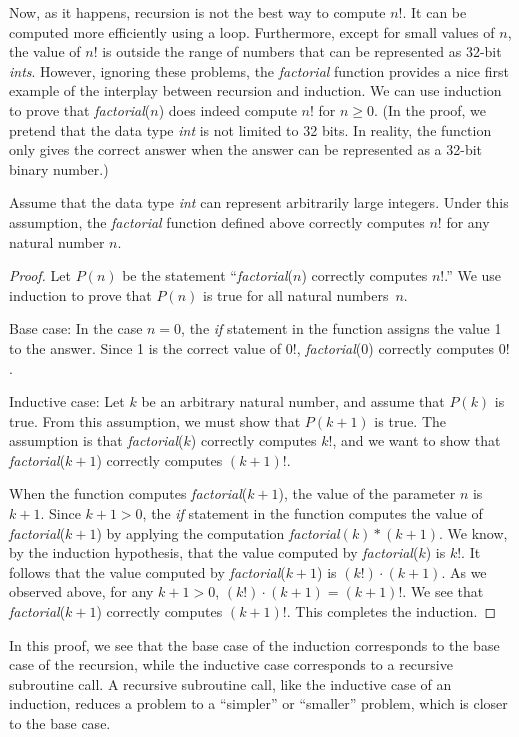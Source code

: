 Now, as it happens, recursion is not the best way to compute $n!$.
It can be computed more efficiently using a loop.  Furthermore,
except for small values of $n$, the value of $n!$ is outside the
range of numbers that can be represented as 32-bit \textit{ints}.
However, ignoring these problems, the \textit{factorial} function
provides a nice first example of the interplay between recursion and
induction.  We can use induction to prove that \textit{factorial}($n$)
does indeed compute $n!$ for $n\ge 0$.  (In the proof, we pretend that
the data type \textit{int} is not limited to 32 bits.  In reality,
the function only gives the correct answer when the answer can be
represented as a 32-bit binary number.)

\begin{theorem}
Assume that the data type \textit{int} can represent arbitrarily large
integers.  Under this assumption, the \textit{factorial} function
defined above correctly computes $n!$ for any natural number $n$.
\end{theorem}
\begin{proof}
Let $P(n)$ be the statement ``\textit{factorial}($n$) correctly computes $n!$.''
We use induction to prove that $P(n)$ is true for all natural numbers~$n$.

Base case:  In the case $n=0$, the \textit{if} statement in the function
assigns the value 1 to the answer.  Since 1 is the correct value of
$0!$, \textit{factorial}(0) correctly computes $0!$.

Inductive case:  Let $k$ be an arbitrary natural number, and assume that
$P(k)$ is true.  From this assumption, we must show that $P(k+1)$ is true.
The assumption is that \textit{factorial}($k$) correctly computes $k!$,
and we want to show that \textit{factorial}($k+1$) correctly computes
$(k+1)!$.

When the function computes \textit{factorial}($k+1$), the value of
the parameter $n$ is $k+1$.
Since $k+1>0$, the \textit{if} statement in the function computes the
value of \textit{factorial}($k+1$) by applying the computation
\textit{factorial}$(k)*(k+1)$.  We know, by the induction hypothesis,
that the value computed by \textit{factorial}($k$) is $k!$.
It follows that the value computed by \textit{factorial}($k+1$)
is $(k!)\cdot(k+1)$.  As we observed above, for any $k+1>0$,
$(k!)\cdot(k+1)=(k+1)!$.  We see that \textit{factorial}($k+1$)
correctly computes $(k+1)!$.  This completes the induction.
\end{proof}

In this proof, we see that the base case of the induction corresponds
to the base case of the recursion, while the inductive case corresponds
to a recursive subroutine call.  A recursive subroutine call,
like the inductive case of an induction, reduces a problem to
a ``simpler'' or ``smaller'' problem, which is closer to the base
case.

